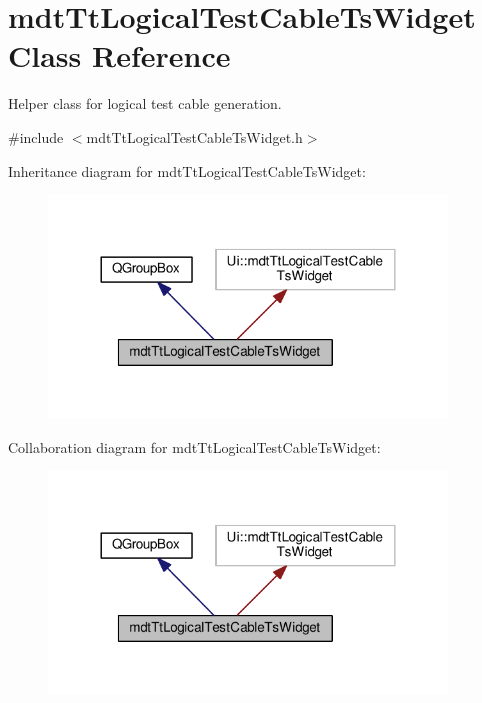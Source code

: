 \hypertarget{classmdt_tt_logical_test_cable_ts_widget}{\section{mdt\-Tt\-Logical\-Test\-Cable\-Ts\-Widget Class Reference}
\label{classmdt_tt_logical_test_cable_ts_widget}
}


Helper class for logical test cable generation.  




{\ttfamily \#include $<$mdt\-Tt\-Logical\-Test\-Cable\-Ts\-Widget.\-h$>$}



Inheritance diagram for mdt\-Tt\-Logical\-Test\-Cable\-Ts\-Widget\-:
\nopagebreak
\begin{figure}[H]
\begin{center}
\leavevmode
\includegraphics[width=300pt]{classmdt_tt_logical_test_cable_ts_widget__inherit__graph}
\end{center}
\end{figure}


Collaboration diagram for mdt\-Tt\-Logical\-Test\-Cable\-Ts\-Widget\-:
\nopagebreak
\begin{figure}[H]
\begin{center}
\leavevmode
\includegraphics[width=300pt]{classmdt_tt_logical_test_cable_ts_widget__coll__graph}
\end{center}
\end{figure}
